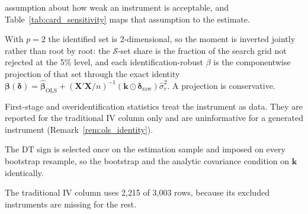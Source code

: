 \begin{table}[htbp]
\begin{threeparttable}
\begin{tablenotes}
assumption about how weak an instrument is acceptable, and
Table~\ref{tab:card_sensitivity} maps that assumption to the estimate.
\item With $p=2$ the identified set is 2-dimensional, so the moment is inverted
jointly rather than root by root: the $\mathcal S$-set share is the fraction of the
search grid not rejected at the 5\% level, and each identification-robust
$\beta$ is the componentwise projection of that set through the exact
identity $\boldsymbol\beta(\boldsymbol\delta)=
\widehat{\boldsymbol\beta}_{\mathrm{OLS}}
+(\mathbf X'\mathbf X/n)^{-1}(\mathbf k\odot\boldsymbol\delta_{\mathrm{raw}})
\widehat\sigma_r^2$. A projection is conservative.
\item First-stage and overidentification statistics treat the instrument
as data. They are reported for the traditional IV column only and are
uninformative for a generated instrument
(Remark~\ref{rem:ols_identity}).
\item The DT sign is selected once on the estimation sample and imposed on
every bootstrap resample, so the bootstrap and the analytic covariance
condition on $\mathbf k$ identically.
\item The traditional IV column uses 2{,}215 of 3{,}003 rows, because its
excluded instruments are missing for the rest.
\end{tablenotes}
\end{threeparttable}
\end{table}
